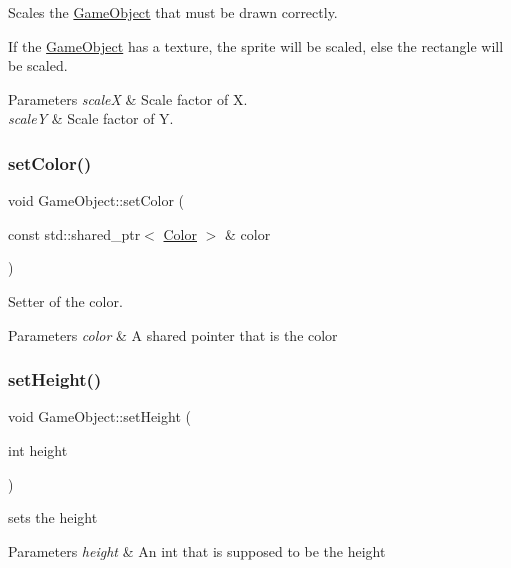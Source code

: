 Scales the \hyperlink{classGameObject}{Game\+Object} that must be drawn correctly. 

If the \hyperlink{classGameObject}{Game\+Object} has a texture, the sprite will be scaled, else the rectangle will be scaled. 
\begin{DoxyParams}{Parameters}
{\em scaleX} & Scale factor of X. \\
\hline
{\em scaleY} & Scale factor of Y. \\
\hline
\end{DoxyParams}
\mbox{\label{classGameObject_a9751f8cfc3a86b61524879fb3f0aea79}} 
\subsubsection{\texorpdfstring{set\+Color()}{setColor()}}
{\footnotesize\ttfamily void Game\+Object\+::set\+Color (\begin{DoxyParamCaption}\item[{const std\+::shared\+\_\+ptr$<$ \hyperlink{structColor}{Color} $>$ \&}]{color }\end{DoxyParamCaption})}



Setter of the color. 


\begin{DoxyParams}{Parameters}
{\em color} & A shared pointer that is the color \\
\hline
\end{DoxyParams}
\mbox{\label{classGameObject_aa08869921287057b06c7f2ae89eef9ab}} 
\subsubsection{\texorpdfstring{set\+Height()}{setHeight()}}
{\footnotesize\ttfamily void Game\+Object\+::set\+Height (\begin{DoxyParamCaption}\item[{int}]{height }\end{DoxyParamCaption})}



sets the height 


\begin{DoxyParams}{Parameters}
{\em height} & An int that is supposed to be the height \\
\hline
\end{DoxyParams}
\mbox{\label{classGameObject_a728c8a03416fd7bde2498d79ae6c26a3}} 
